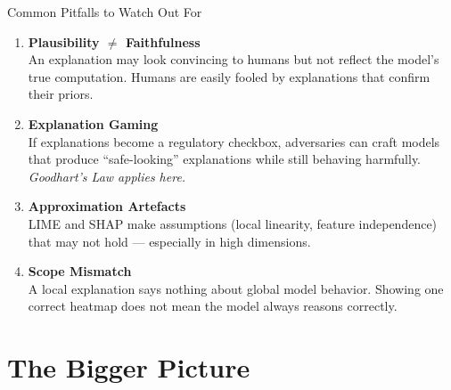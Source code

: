 \documentclass[aspectratio=169]{beamer}
\begin{document}
\begin{frame}{Common Pitfalls to Watch Out For}
  \begin{enumerate}
    \setlength\itemsep{0.6em}
    \item \textbf{Plausibility $\neq$ Faithfulness}\\
          An explanation may look convincing to humans but not reflect
          the model's true computation. Humans are easily fooled by
          explanations that confirm their priors.

    \item \textbf{Explanation Gaming}\\
          If explanations become a regulatory checkbox, adversaries can craft
          models that produce ``safe-looking'' explanations
          while still behaving harmfully.
          \emph{Goodhart's Law applies here.}

    \item \textbf{Approximation Artefacts}\\
          LIME and SHAP make assumptions (local linearity, feature
          independence) that may not hold — especially in high dimensions.

    \item \textbf{Scope Mismatch}\\
          A local explanation says nothing about global model behavior.
          Showing one correct heatmap does not mean the model always
          reasons correctly.
  \end{enumerate}
\end{frame}

\section{The Bigger Picture}
\end{document}
